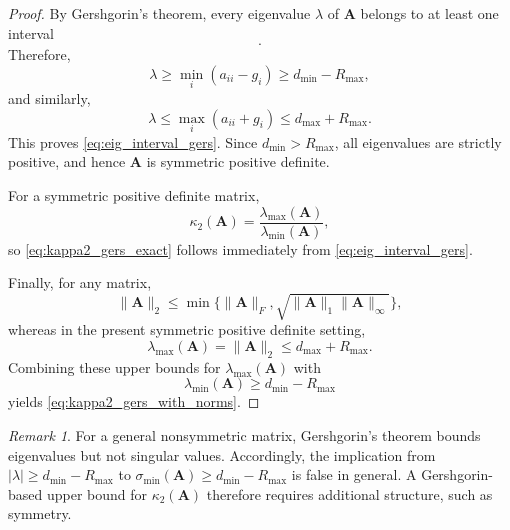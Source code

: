 \documentclass[11pt,a4paper]{article}
\theoremstyle{plain}
\theoremstyle{definition}
\theoremstyle{remark}
\newtheorem{remark}{Remark}
\begin{document}
\begin{proof}
By Gershgorin's theorem, every eigenvalue $\lambda$ of $\mathbf{A}$ belongs to at least one interval
\begin{equation*}
[a_{ii}-g_i,\;a_{ii}+g_i].
\end{equation*}
Therefore,
\begin{equation*}
\lambda\ge \min_i(a_{ii}-g_i)\ge d_{\min}-R_{\max},
\end{equation*}
and similarly,
\begin{equation*}
\lambda\le \max_i(a_{ii}+g_i)\le d_{\max}+R_{\max}.
\end{equation*}
This proves \eqref{eq:eig_interval_gers}. Since $d_{\min}>R_{\max}$, all eigenvalues are strictly positive, and hence $\mathbf{A}$ is symmetric positive definite.

For a symmetric positive definite matrix,
\begin{equation*}
\kappa_2(\mathbf{A})
=
\frac{\lambda_{\max}(\mathbf{A})}{\lambda_{\min}(\mathbf{A})},
\end{equation*}
so \eqref{eq:kappa2_gers_exact} follows immediately from \eqref{eq:eig_interval_gers}.

Finally, for any matrix,
\begin{equation*}
\|\mathbf{A}\|_2\le \min\{\|\mathbf{A}\|_F,\sqrt{\|\mathbf{A}\|_1\|\mathbf{A}\|_\infty}\},
\end{equation*}
whereas in the present symmetric positive definite setting,
\begin{equation*}
\lambda_{\max}(\mathbf{A})=\|\mathbf{A}\|_2\le d_{\max}+R_{\max}.
\end{equation*}
Combining these upper bounds for $\lambda_{\max}(\mathbf{A})$ with
\begin{equation*}
\lambda_{\min}(\mathbf{A})\ge d_{\min}-R_{\max}
\end{equation*}
yields \eqref{eq:kappa2_gers_with_norms}.
\end{proof}

\begin{remark}
\label{rem:gers_nonsym}
For a general nonsymmetric matrix, Gershgorin's theorem bounds eigenvalues but not singular values. Accordingly, the implication from $|\lambda|\ge d_{\min}-R_{\max}$ to $\sigma_{\min}(\mathbf{A})\ge d_{\min}-R_{\max}$ 
is false in general. A Gershgorin-based upper bound for $\kappa_2(\mathbf{A})$ therefore requires additional structure, such as symmetry.
\end{remark}
\end{document}
